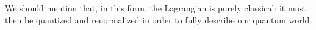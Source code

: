 \documentclass[10pt,a4paper]{book}
\begin{document}
We should mention that, in this form, the Lagrangian is purely classical: it must then be quantized and renormalized \cite{tHooft:1971qjg} in order to fully describe our quantum world. 

	

\nocite{Thomson:2013zua, Ryder:1985wq, Peskin:1995ev, Pich:2012sx}
\end{document}
